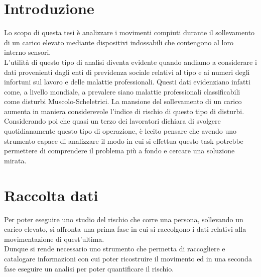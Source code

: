 \documentclass[a4paper]{article}
\begin{document}
	
	
\begin{frontespizio} 
 \Preambolo{\renewcommand{\frontpretitlefont}{\fontsize{14}{12}\scshape}}


\Rientro{1cm} 
\Punteggiatura{} 
 
\end{frontespizio}

	\tableofcontents

	\clearpage

	\section{Introduzione}
Lo scopo di questa tesi è analizzare i movimenti compiuti durante il sollevamento di un carico elevato mediante dispositivi indossabili che contengono al loro interno sensori. \\
L’utilità di questo tipo di analisi diventa evidente quando andiamo a considerare i dati provenienti dagli enti di previdenza sociale relativi al tipo e ai numeri degli infortuni sul lavoro e delle malattie professionali. Questi dati evidenziano infatti come, a livello mondiale, a prevalere siano malattie professionali classificabili come disturbi Muscolo-Scheletrici.
La mansione del sollevamento di un carico aumenta in maniera considerevole l'indice di rischio di questo tipo di disturbi.
Considerando poi che quasi un terzo dei lavoratori dichiara di svolgere quotidianamente questo tipo di operazione, è lecito pensare che avendo uno strumento capace di analizzare il modo in cui si effettua questo task potrebbe permettere di comprendere il problema più a fondo e cercare una soluzione mirata.

	\clearpage

	\section{Raccolta dati}
Per poter eseguire uno studio del rischio che corre una persona, sollevando un carico elevato, si affronta una prima fase in cui si raccolgono i dati relativi alla movimentazione di quest'ultima. \\
Dunque si rende necessario uno strumento che permetta di raccogliere e catalogare informazioni con cui poter ricostruire il movimento ed in una seconda fase eseguire un analisi per poter quantificare il rischio.
\end{document}
